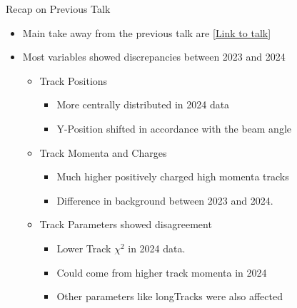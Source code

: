 \begin{frame}{Recap on Previous Talk}
    \begin{itemize}
        \small
        \item Main take away from the previous talk are [\href{https://indico.cern.ch/event/1488927/}{Link to talk}]
        \item Most variables showed discrepancies between 2023 and 2024
        \begin{itemize}
            \item Track Positions
            \begin{itemize}
                \item More centrally distributed in 2024 data
                \item Y-Position shifted in accordance with the beam angle
            \end{itemize}
            \item Track Momenta and Charges
            \begin{itemize}
                \item Much higher positively charged high momenta tracks
                \item Difference in background between 2023 and 2024.
            \end{itemize}
            \item Track Parameters showed disagreement
            \begin{itemize}
                \item Lower Track $\chi^2$ in 2024 data.
                \item Could come from higher track momenta in 2024
                \item Other parameters like longTracks were also affected
            \end{itemize}
        \end{itemize}
    \end{itemize}    
\end{frame}


